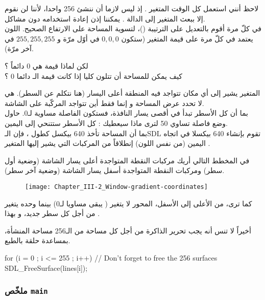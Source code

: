  لاحظ أنني استعمل كل الوقت المتغير 
.
إذ ليس لازما أن ننشئ 256 واحدا، لأننا لن نقوم إلا ببعث المتغير إلى الدالة 
.
يمكننا إذن إعادة استخدامه دون مشاكل.\\
في كلّ مرة أقوم بالتعديل على الترتيبة
()،
لتسوية المساحة على الارتفاع الصحيح. اللون يعتمد في كلّ مرة على قيمة المتغير
(ستكون
$0, 0, 0$
في أوّل مرّة و $255, 255, 255$ في آخر مرّة).

\begin{question}
لكن لماذا قيمة 
هي 0 دائماً ؟\\
كيف يمكن للمساحة أن تتلون كليا إذا كانت قيمة الـ
دائما 0 ؟
\end{question}

المتغير
يشير إلى أي مكان تتواجد فيه المنطقة أعلى اليسار (هنا نتكلم عن السطر). هي لا تحدد عرض المساحة و إنما فقط أين تتواجد المركّبة على الشاشة.\\
بما أن كل الأسطر تبدأ في أقصى يسار النافذة، فستكون الفاصلة مساوية لـ0. حاول وضع فاصلة تساوي 50 لترى ماذا سيعطيك : كل الأسطر ستتنحي إلى اليمين.\\
بما أن المساحة تأخذ 640 بيكسل كطول ، فإن الـ\textenglish{SDL}
تقوم بإنشاء 640 بيكسلا في اتجاه اليمين (من نفس اللون) إنطلاقاً من المركبات التي يشير إليها المتغير 
.

في المخطط التالي أريك مركبات النقطة المتواجدة أعلى يسار الشاشة (وضعية أول سطر) ومركبات النقطة المتواجدة أسفل يسار الشاشة (وضعية آخر سطر).

\begin{figure}[H]
	\centering
	\texttt{[image: Chapter\_III-2\_Window-gradient-coordinates]}
\end{figure}

كما ترى، من الأعلى إلى الأسفل، المحور لا يتغير 
(
يبقى مساويا لـ0) بينما 
وحده يتغير من أجل كل سطر جديد، و بهذا 
.

أخيراً لا تنس أنه يجب تحرير الذاكرة من أجل كل مساحة من الـ256 مساحة المنشأة، بمساعدة حلقة بالطبع.

\begin{Csource}
for (i = 0 ; i <= 255 ; i++) // Don't forget to free the 256 surfaces
	SDL_FreeSurface(lines[i]);
\end{Csource}

\subsubsection{ملخّص \texttt{main}}

